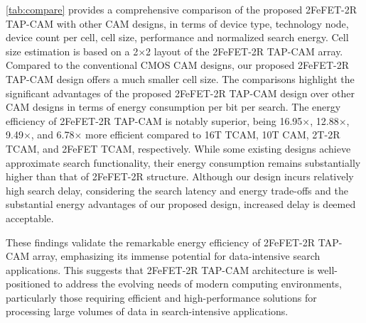 

\autoref{tab:compare} provides a comprehensive comparison of the proposed 2FeFET-2R TAP-CAM with other CAM designs, in terms of  device type, technology node, device count per cell, cell size, performance and normalized search energy. Cell size estimation is based on a 2$\times$2 layout of the 2FeFET-2R TAP-CAM array.
Compared to the conventional  CMOS  CAM designs, our proposed  2FeFET-2R TAP-CAM design offers a much smaller cell size. 
The  comparisons highlight the significant advantages of the proposed 2FeFET-2R TAP-CAM design over other CAM designs in terms of energy consumption per bit per search.
The energy efficiency of 2FeFET-2R TAP-CAM is notably superior, being 16.95$\times$, 12.88$\times$, 9.49$\times$, and 6.78$\times$ more efficient compared to 16T TCAM, 10T CAM, 2T-2R TCAM, and 2FeFET TCAM, respectively. 
While some existing designs  achieve approximate search functionality, their energy consumption remains substantially higher than that of 2FeFET-2R structure. 
Although our design incurs relatively high search delay, considering the search latency and energy  trade-offs and the substantial energy advantages of our proposed design, increased delay is deemed acceptable.


These findings validate the remarkable energy efficiency of 2FeFET-2R TAP-CAM  array, emphasizing its immense potential for data-intensive search applications. This suggests that 2FeFET-2R TAP-CAM architecture is well-positioned to address the evolving needs of modern computing environments, particularly those requiring efficient and high-performance solutions for processing large volumes of data in search-intensive applications.

